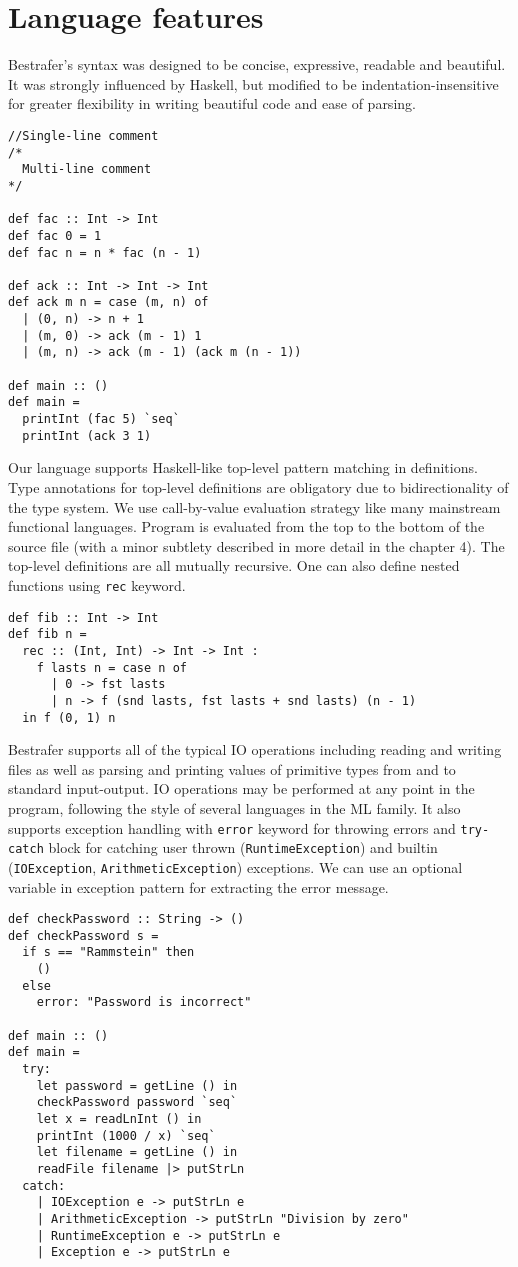 \documentclass[declaration,shortabstract,english]{iithesis}
\begin{document}
\section{Language features}
Bestrafer's syntax was designed to be concise, expressive, readable and beautiful.
It was strongly influenced by Haskell, but modified to be indentation-insensitive for greater
flexibility in writing beautiful code and ease of parsing.
\begin{verbatim}
//Single-line comment
/*
  Multi-line comment
*/

def fac :: Int -> Int
def fac 0 = 1
def fac n = n * fac (n - 1)

def ack :: Int -> Int -> Int
def ack m n = case (m, n) of
  | (0, n) -> n + 1
  | (m, 0) -> ack (m - 1) 1
  | (m, n) -> ack (m - 1) (ack m (n - 1))

def main :: ()
def main =
  printInt (fac 5) `seq`
  printInt (ack 3 1)
\end{verbatim}
Our language supports Haskell-like top-level pattern matching in definitions. Type annotations
for top-level definitions are obligatory due to bidirectionality of the type system.
We use call-by-value evaluation strategy like many mainstream functional languages.
Program is evaluated from the top to the bottom of the source file
(with a minor subtlety described in more detail in the chapter 4). The top-level definitions
are all mutually recursive. One can also define nested functions using \verb+rec+ keyword.
\begin{verbatim}
def fib :: Int -> Int
def fib n =
  rec :: (Int, Int) -> Int -> Int :
    f lasts n = case n of
      | 0 -> fst lasts
      | n -> f (snd lasts, fst lasts + snd lasts) (n - 1)
  in f (0, 1) n
\end{verbatim}

Bestrafer supports all of the typical IO operations including reading and writing files as well as
parsing and printing values of primitive types from and to standard input-output.
IO operations may be performed at any point in the program, following the style of
several languages in the ML family. It also supports exception handling with \verb+error+
keyword for throwing errors and \verb+try-catch+ block for catching
user thrown (\verb+RuntimeException+) and builtin (\verb+IOException+,
\verb+ArithmeticException+) exceptions. We can use an optional variable in exception pattern
for extracting the error message.
\begin{verbatim}
def checkPassword :: String -> ()
def checkPassword s =
  if s == "Rammstein" then
    ()
  else
    error: "Password is incorrect"

def main :: ()
def main =
  try:
    let password = getLine () in
    checkPassword password `seq`
    let x = readLnInt () in
    printInt (1000 / x) `seq`
    let filename = getLine () in
    readFile filename |> putStrLn
  catch:
    | IOException e -> putStrLn e
    | ArithmeticException -> putStrLn "Division by zero"
    | RuntimeException e -> putStrLn e
    | Exception e -> putStrLn e
\end{verbatim}
\end{document}
